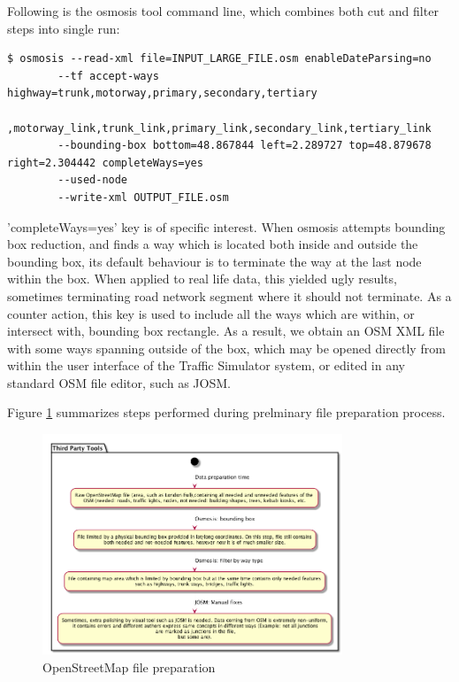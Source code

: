 Following is the osmosis tool command line, which combines both cut and filter steps into single run:
\begin{lstlisting}
$ osmosis --read-xml file=INPUT_LARGE_FILE.osm enableDateParsing=no
        --tf accept-ways highway=trunk,motorway,primary,secondary,tertiary
            ,motorway_link,trunk_link,primary_link,secondary_link,tertiary_link
        --bounding-box bottom=48.867844 left=2.289727 top=48.879678 right=2.304442 completeWays=yes
        --used-node
        --write-xml OUTPUT_FILE.osm
\end{lstlisting}
'completeWays=yes' key is of specific interest. When osmosis attempts bounding box reduction, and finds a way which is located both inside and outside the bounding box, its default behaviour is to terminate the way at the last node within the box. When applied to real life data, this yielded ugly results, sometimes terminating road network segment where it should not terminate. As a counter action, this key is used to include all the ways which are within, or intersect with, bounding box rectangle.  As a result, we obtain an OSM XML file with some ways spanning outside of the box, which may be opened directly from within the user interface of the Traffic Simulator system, or edited in any standard OSM file editor, such as JOSM.

Figure \ref{fig:thirdPartyToolsOSMPreparation} summarizes steps performed during prelminary file preparation process.
\begin{figure}[h]
    \caption{OpenStreetMap file preparation}
    \label{fig:thirdPartyToolsOSMPreparation}
    \centering
    \includegraphics[width=0.8\textwidth]{../../uml_diagrams/thirdPartyToolsDataLoading.png}
\end{figure}


